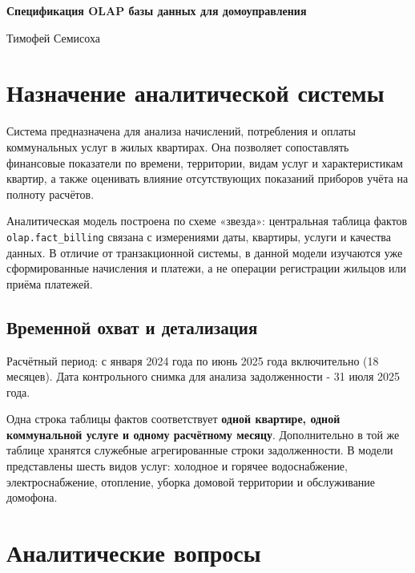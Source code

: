 \documentclass[12pt]{article}
\begin{document}
\begin{titlepage}
    \centering
    \vspace*{\fill}
    
    {\Huge\bfseries Спецификация OLAP базы данных для домоуправления}
    
    \vspace{0.5cm}
    
    {\Large Тимофей Семисоха}
    
    \vspace*{\fill}
\end{titlepage}

\tableofcontents

\newpage
{}
\setcounter{page}{2}

\section{Назначение аналитической системы}
Система предназначена для анализа начислений, потребления и оплаты коммунальных услуг в жилых квартирах. Она позволяет сопоставлять финансовые показатели по времени, территории, видам услуг и характеристикам квартир, а также оценивать влияние отсутствующих показаний приборов учёта на полноту расчётов.

Аналитическая модель построена по схеме «звезда»: центральная таблица фактов \texttt{olap.fact\_billing} связана с измерениями даты, квартиры, услуги и качества данных. В отличие от транзакционной системы, в данной модели изучаются уже сформированные начисления и платежи, а не операции регистрации жильцов или приёма платежей.

\subsection{Временной охват и детализация}
Расчётный период: с января 2024 года по июнь 2025 года включительно (18 месяцев). Дата контрольного снимка для анализа задолженности - 31 июля 2025 года.

Одна строка таблицы фактов соответствует \textbf{одной квартире, одной коммунальной услуге и одному расчётному месяцу}. Дополнительно в той же таблице хранятся служебные агрегированные строки задолженности. В модели представлены шесть видов услуг: холодное и горячее водоснабжение, электроснабжение, отопление, уборка домовой территории и обслуживание домофона.

\section{Аналитические вопросы}
\end{document}
